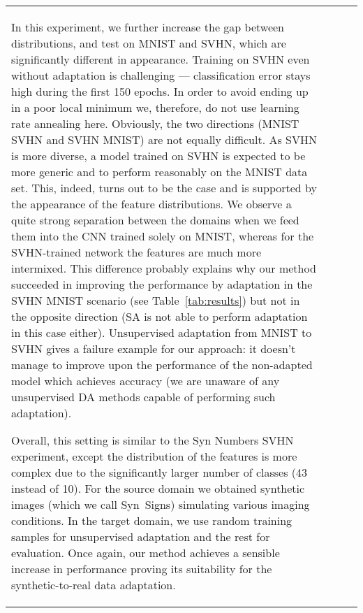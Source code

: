 \documentclass[twoside,11pt]{article}
\newlength\figureheight
\newlength\figurewidth
\newcommand{\tab}[1]{Table~\ref{tab:#1}}
\begin{document}
\begin{table*}[t]
{\begin{tabular}{lccc}
\vspace{2mm}\noindent {\it MNIST  SVHN.}
In this experiment, we further increase the gap between distributions, and test on {\sc MNIST} and {\sc SVHN}, which are significantly different in appearance. Training on SVHN even without adaptation is challenging --- classification error stays high during the first 150 epochs. In order to avoid ending up in a poor local minimum we, therefore, do not use learning rate annealing here. Obviously, the two directions ({\sc MNIST}  {\sc SVHN} and {\sc SVHN}  {\sc MNIST}) are not equally difficult. As {\sc SVHN} is more diverse, a model trained on SVHN is expected to be more generic and to perform reasonably on the MNIST data set. This, indeed, turns out to be the case and is supported by the appearance of the feature distributions. We observe a quite strong separation between the domains when we feed them into the CNN trained solely on {\sc MNIST}, whereas for the {\sc SVHN}-trained network the features are much more intermixed. This difference probably explains why our method succeeded in improving the performance by adaptation in the {\sc SVHN}  {\sc MNIST} scenario (see \tab{results}) but not in the opposite direction (SA is not able to perform adaptation in this case either). Unsupervised adaptation from {\sc MNIST} to {\sc SVHN} gives a failure example for our approach: it doesn't manage to improve upon the performance of the non-adapted model which achieves  accuracy (we are unaware of any unsupervised DA methods capable of performing such adaptation).

\vspace{2mm}\noindent {\it Synthetic Signs  GTSRB.}
Overall, this setting is similar to the {\sc Syn Numbers}  {\sc SVHN} experiment, except the distribution of the features is more complex due to the significantly larger number of classes (43 instead of 10). For the source domain we obtained  synthetic images (which we call {\sc Syn~Signs}) simulating various imaging conditions. In the target domain, we use  random training samples for unsupervised adaptation and the rest for evaluation. Once again, our method achieves a sensible increase in performance proving its suitability for the synthetic-to-real data adaptation.

\begin{figure}
  \centering
  \setlength\figureheight{4cm}
  \setlength\figurewidth{6.8cm}
\definecolor{mycolor1}{rgb}{0.00000,0.00000,0.00000}\definecolor{mycolor2}{rgb}{0.00000,1.00000,0.40000}\definecolor{mycolor3}{rgb}{0.00000,0.40000,1.00000}\definecolor{mycolor4}{rgb}{0.80000,0.00000,1.00000}\begin{tikzpicture}[ampersand replacement=\&,font=\scriptsize]


\end{tikzpicture}
\end{figure}
\end{tabular}}
\end{table*}
\end{document}
